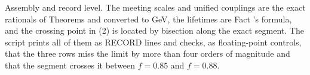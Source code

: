 Assembly and record level. The meeting scales and unified couplings are the exact rationals of Theorems  and  converted to GeV, the lifetimes are Fact 's formula, and the crossing point in (2) is located by bisection along the exact segment. The script prints all of them as RECORD lines and checks, as floating-point controls, that the three rows miss the limit by more than four orders of magnitude and that the segment crosses it between $f = 0.85$ and $f = 0.88$.
